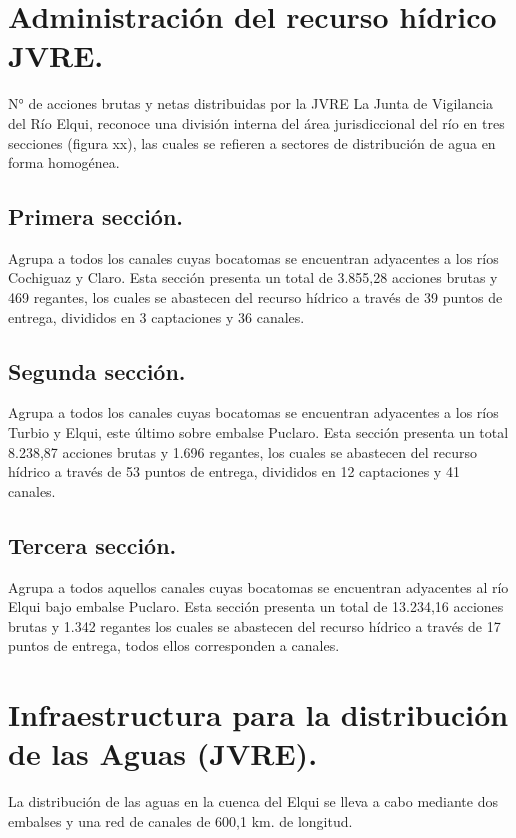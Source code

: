 \documentclass[10pt,]{article}
\begin{document}
\section{Administración del recurso hídrico JVRE.}%

N° de acciones brutas y netas distribuidas por la JVRE
La Junta de Vigilancia del Río Elqui, reconoce una división interna del área jurisdiccional del río en tres secciones (figura xx), las cuales se refieren a sectores de distribución de agua en forma homogénea. 

\subsection{Primera sección.}
Agrupa a todos los canales cuyas bocatomas se encuentran adyacentes a los ríos Cochiguaz y Claro. Esta sección presenta un total de 3.855,28 acciones brutas y 469 regantes, los cuales se abastecen del recurso hídrico a través de 39 puntos de entrega, divididos en 3 captaciones y 36 canales.

\subsection{Segunda sección.}
Agrupa a todos los canales cuyas bocatomas se encuentran adyacentes a los ríos Turbio y Elqui, este último sobre embalse Puclaro. Esta sección presenta un total 8.238,87 acciones brutas y 1.696 regantes, los cuales se abastecen del recurso hídrico a través de 53 puntos de entrega, divididos en 12 captaciones y 41 canales.

\subsection{Tercera sección.}
Agrupa a todos aquellos canales cuyas bocatomas se encuentran adyacentes al río Elqui bajo  embalse Puclaro. Esta sección presenta un total de 13.234,16 acciones brutas y 1.342 regantes los cuales se abastecen del recurso hídrico a través de 17 puntos de entrega, todos ellos corresponden a canales.

\section{Infraestructura para la distribución de las Aguas (JVRE).}
La distribución de las aguas en la cuenca del Elqui se lleva a cabo mediante dos embalses y una red de canales de 600,1 km. de longitud.
\end{document}
